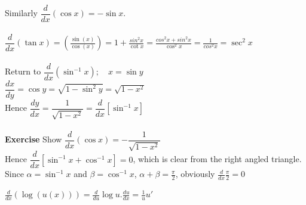Similarly $\dfrac{d}{dx}(\cos x) = -\sin x$.\\\\

$\displaystyle{
\dfrac{d}{dx}(\tan x) = \left(\frac{\sin(x)}{\cos(x)}\right) = 1 + \frac{sin^2x}{\cot x} = \frac{cos^2x + sin^2x}{\cos^2x} = \frac{1}{cos^2x} = \sec^2x
}$\\\\

Return to $\dfrac{d}{dx}(\sin^{-1}x); \quad x = \sin y$\\

$\dfrac{dx}{dy} = \cos y = \sqrt{1 - \sin^2y} = \sqrt{1 - x^2}$\\

Hence $\dfrac{dy}{dx} = \dfrac{1}{\sqrt{1-x^2}} = \dfrac{d}{dx}[\sin^{-1}x]$\\\\

\textbf{Exercise} Show $\dfrac{d}{dx}(\cos x) = -\dfrac{1}{\sqrt{1-x^2}}$\\

Hence $\dfrac{d}{dx}[\sin^{-1}x + \cos^{-1}x] = 0$, which is clear from the right angled triangle.\\
Since $\alpha = \sin^{-1}x$ and $\beta = \cos^{-1}x$, $\alpha + \beta = \frac{\pi}{2}$, obviously $\frac{d}{dx} \frac{\pi}{2} = 0$
\\



$\displaystyle{
\frac{d}{dx}(\log(u(x))) = \frac{d}{du}\log u.\frac{du}{dx} = \frac{1}{u}u'
}$\\

